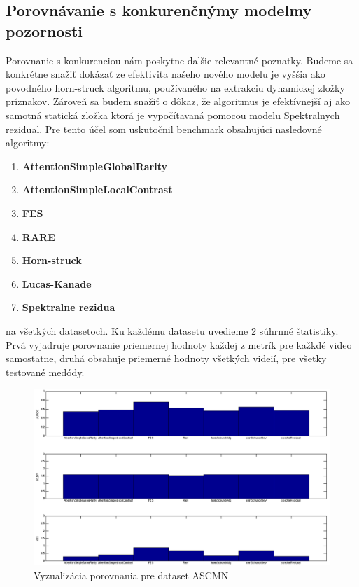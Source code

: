 \subsection{Porovnávanie s konkurenčnýmy modelmy pozornosti}
Porovnanie s konkurenciou nám poskytne dalšie relevantné poznatky.
Budeme sa konkrétne snažiť dokázať ze efektivita našeho nového modelu je vyššia ako povodného horn-struck algoritmu\cite{horn-schunck}, používaného na extrakciu dynamickej zložky príznakov.
Zároveň sa budem snažiť o dôkaz, že algoritmus je efektívnejší aj ako samotná statická zložka ktorá je vypočítavaná pomocou modelu Spektralnych rezidual\cite{spectral-rezidual}.
Pre tento účel som uskutočnil benchmark obsahujúci nasledovné algoritmy:
\begin{enumerate}
  \item\textbf{AttentionSimpleGlobalRarity\cite{global-rarity}}
  \item\textbf{AttentionSimpleLocalContrast\cite{global-rarity}}
  \item\textbf{FES\cite{fes}}
  \item\textbf{RARE\cite{rare-1}}
  \item\textbf{Horn-struck\cite{horn-schunck}}
  \item\textbf{Lucas-Kanade\cite{lucas-kanade}}
  \item\textbf{Spektralne rezidua\cite{spectral-rezidual}}
\end{enumerate}
na všetkých datasetoch.
Ku každému datasetu uvedieme 2 súhrnné štatistiky.
Prvá vyjadruje porovnanie priemernej hodnoty každej z metrík pre kažkdé video samostatne, druhá obsahuje priemerné hodnoty všetkých videií, pre všetky testované medódy.

\begin{figure}[H]
  \includegraphics[width=15cm]{pics/porovnanie-accv-global-new.png}
  \caption{Vyzualizácia porovnania pre dataset ASCMN\cite{accv}}
\end{figure}

